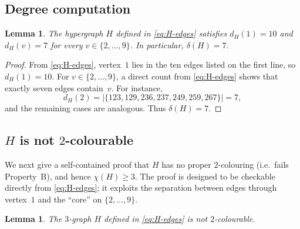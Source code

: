 \documentclass[11pt]{amsart}
\newtheorem{lemma}[theorem]{Lemma}
\theoremstyle{definition}
\theoremstyle{remark}
\newcommand{\del}{\delta}
\begin{document}
\subsection{Degree computation}

\begin{lemma}\label{lem:degrees}
The hypergraph $H$ defined in \eqref{eq:H-edges} satisfies $d_H(1)=10$ and $d_H(v)=7$ for every $v\in\{2,\dots,9\}$.
In particular, $\del(H)=7$.
\end{lemma}

\begin{proof}
From \eqref{eq:H-edges}, vertex~$1$ lies in the ten edges listed on the first line, so $d_H(1)=10$.
For $v\in\{2,\dots,9\}$, a direct count from \eqref{eq:H-edges} shows that exactly seven edges contain~$v$.
For instance,
\[
d_H(2)=|\{123,129,236,237,249,259,267\}|=7,
\]
and the remaining cases are analogous.
Thus $\del(H)=7$.
\end{proof}

\subsection{\texorpdfstring{$H$}{H} is not \texorpdfstring{$2$}{2}-colourable}\label{subsec:not-2-colorable}

We next give a self-contained proof that $H$ has no proper $2$-colouring (i.e.\ fails Property~B), and hence $\chi(H)\ge 3$.
The proof is designed to be checkable directly from \eqref{eq:H-edges}; it exploits the separation between edges through vertex~$1$ and the ``core'' on $\{2,\dots,9\}$.

\begin{lemma}\label{lem:not-2-colorable}
The $3$-graph $H$ defined in \eqref{eq:H-edges} is not $2$-colourable.
\end{lemma}
\end{document}
